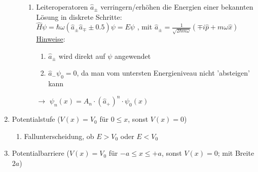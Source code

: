 \begin{enumerate}
\begin{enumerate}
\begin{enumerate}
            \item Leiteroperatoren $\hat{a}_\pm$ verringern/erhöhen die Energien einer bekannten Lösung in diskrete Schritte:\\
            $\hat{H}\psi=\hbar \omega(\hat{a}_\pm \hat{a}_\mp \pm 0.5)\psi=E\psi$ , mit $\hat{a}_\pm=\frac{1}{\sqrt{2\hbar m \omega}}(\mp i\hat{p}+m \omega\hat{x})$ \\
            \underline{Hinweise}:
            \begin{enumerate}
                \item $\hat{a}_\pm$ wird direkt auf $\psi$ angewendet 
                \item $\hat{a}_- \psi_0=0$, da man vom untersten Energieniveau nicht 'absteigen' kann
            \end{enumerate} 
            $\rightarrow$ $\psi_n(x)=A_n\cdot (\hat{a}_+)^n \cdot \psi_0(x)$
        \end{enumerate}

    \end{enumerate}
    \item Potentialstufe ($V(x)=V_0$ für $0\leq x$, sonst $V(x)=0$)
    \begin{enumerate}
        \item Fallunterscheidung, ob $E>V_0$ oder $E<V_0$
    \end{enumerate}
    \item Potentialbarriere ($V(x)=V_0$ für $-a\leq x \leq +a$, sonst $V(x)=0$; mit Breite $2a$) \label{Potentialbarriere}
\end{enumerate}




\newpage